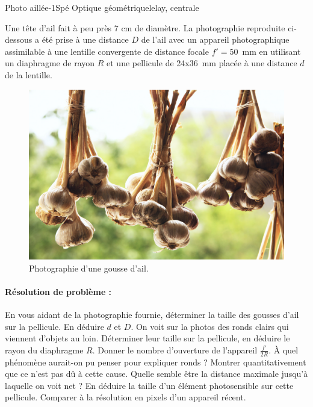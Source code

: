 \begin{exercise}{Photo aillée}{-1}{Spé}
{Optique géométrique}{lelay, centrale}

Une tête d'ail fait à peu près 7 cm de diamètre. La photographie reproduite ci-dessous a été prise à une distance $D$ de l'ail avec un appareil photographique assimilable à une lentille convergente de distance focale $f' = 50$~mm en utilisant un diaphragme de rayon $R$ et une pellicule de 24x36~mm placée à une distance $d$ de la lentille.

\begin{figure}[H]
    \centering
    \includegraphics[width=.8\linewidth]{optique/optiquegeometrique/ail.jpg}
    \caption{Photographie d'une gousse d'ail.}
\end{figure}


\paragraph{Résolution de problème :}
\begin{questions}
    \question En vous aidant de la photographie fournie, déterminer la taille des gousses d’ail sur la pellicule. En déduire $d$ et $D$.
    \question On voit sur la photos des ronds clairs qui viennent d’objets au loin. Déterminer leur taille sur la pellicule, en déduire le rayon
du diaphragme $R$. Donner le nombre d'ouverture de l'appareil $\frac{f'}{2R}$.
    \question À quel phénomène aurait-on pu penser pour expliquer ronds ? Montrer quantitativement que ce n’est pas dû à cette cause.
    \question Quelle semble être la distance maximale jusqu’à laquelle on voit net ? En déduire la taille d’un élément photosensible sur cette
pellicule. Comparer à la résolution en pixels d’un appareil récent.
\end{questions}

\end{exercise}